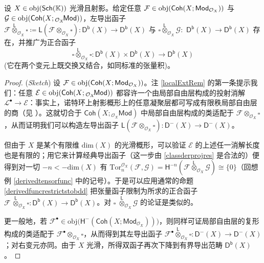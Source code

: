 \begin{Pro}\label{tensorbifunconbdd}
设 $X\in\textup{obj}(\mathsf{Sch}(\mathbb{K}))$ 光滑且射影。给定任意 $\mathcal{F}\in\textup{obj}(\mathsf{Coh}(X;\mathsf{Mod}_{\mathcal{O}_X}))$ 与 $\mathcal{G}\in\textup{obj}(\mathsf{Coh}(X;{}_{\mathcal{O}_X}\!\mathsf{Mod}))$，左导出函子 $\mathcal{F}\overset{\mathsf{L}}{\otimes}_{\mathcal{O}_X}\!\square\coloneqq\mathsf{L}(\mathcal{F}\otimes_{\mathcal{O}_X}\!\square):\mathsf{D^b}(X)\rightarrow\mathsf{D^b}(X)$ 与 $\square\overset{\mathsf{L}}{\otimes}_{\mathcal{O}_X}\mathcal{G}:$ $\mathsf{D^b}(X)\rightarrow\mathsf{D^b}(X)$ 存在，并推广为正合函子
\[
\square\overset{\mathsf{L}}{\otimes}_{\mathcal{O}_X}\!\square:\mathsf{D^b}(X)\times\mathsf{D^b}(X)\rightarrow\mathsf{D^b}(X)
\]
\textup(它在两个变元上既交换又结合，如同标准的张量积\textup)。
\end{Pro}

\begin{proof}(\textit{Sketch})
设 $\mathcal{F}\in\textup{obj}(\mathsf{Coh}(X;\mathsf{Mod}_{\mathcal{O}_X}))$。注 \ref{localExtRem} 的第一条提示我们：任意 $\mathcal{E}\in\textup{obj}(\mathsf{Coh}(X;{}_{\mathcal{O}_X}\!\mathsf{Mod}))$ 都容许一个由局部自由层构成的投射消解 $\mathcal{L}^\bullet\rightarrow\mathcal{E}$：事实上，诺特环上射影概形上的任意凝聚层都可写成有限秩局部自由层的商（见 \cite[Corollary II.5.18]{[Har77]}）。这就切合于 $\mathsf{Coh}(X;{}_{\mathcal{O}_X}\!\mathsf{Mod})$ 中局部自由层构成的类适配于 $\mathcal{F}\otimes_{\mathcal{O}_X}\!\square$，从而证明我们可以构造左导出函子 $\mathsf{L}(\mathcal{F}\otimes_{\mathcal{O}_X}\!\square):\mathsf{D^-}(X)\rightarrow\mathsf{D^-}(X)$。

但由于 $X$ 是某个有限维 $\text{dim}(X)$ 的光滑概形，可以验证 $\mathcal{E}$ 的上述任一消解长度也是有限的；用它来计算经典导出函子（这一步由 \eqref{classderprojres} 是合法的）便得到对一切 $-n<-\text{dim}(X)$ 有 $\text{Tor}_n^{\mathcal{O}_X}(\mathcal{F},\mathcal{G})=\mathsf{H}^{-n}(\mathcal{F}\overset{\mathsf{L}}{\otimes}_{\mathcal{O}_X}\mathcal{G})\cong\{0\}$（回想例 \ref{derivedtensorfunc} 中的记号）。于是可以应用通常的命题 \ref{derivedfuncrestrictstobdd} 把张量函子限制为所求的正合函子 $\mathcal{F}\,\overset{\mathsf{L}}{\otimes}_{\mathcal{O}_X}\!\square:\mathsf{D^b}(X)\rightarrow\mathsf{D^b}(X)$。对 $\square\;\overset{\mathsf{L}}{\otimes}_{\mathcal{O}_X}\!\mathcal{G}$ 的论证是类似的。

更一般地，若 $\mathcal{F}^\bullet\in\text{obj}\big(\mathsf{H^-}(\mathsf{Coh}(X;\mathsf{Mod}_{\mathcal{O}_X}))\big)$，则同样可证局部自由层的复形构成的类适配于 $\mathcal{F}^\bullet\otimes_{\mathcal{O}_X}\!\square$，从而得到其左导出函子 $\mathcal{F}^\bullet\overset{\mathsf{L}}{\otimes}_{\mathcal{O}_X}\!\square:\mathsf{D^-}(X)\rightarrow\mathsf{D^-}(X)$；对右变元亦同。由于 $X$ 光滑，所得双函子再次下降到有界导出范畴 $\mathsf{D^b}(X)$。          
\end{proof}

